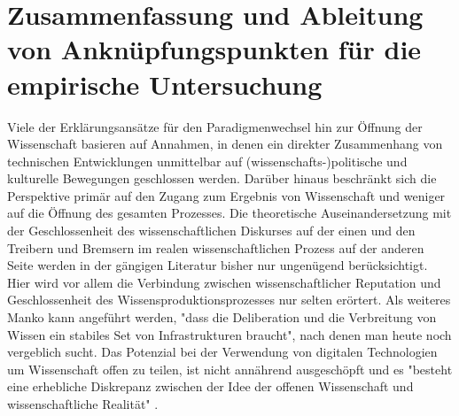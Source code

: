 \section{Zusammenfassung und Ableitung von Anknüpfungspunkten für die empirische Untersuchung}
Viele der Erklärungsansätze für den Paradigmenwechsel hin zur Öffnung der Wissenschaft basieren auf Annahmen, in denen ein direkter Zusammenhang von technischen Entwicklungen unmittelbar auf (wissenschafts-)politische und kulturelle Bewegungen geschlossen werden. Darüber hinaus beschränkt sich die Perspektive primär auf den Zugang zum Ergebnis von Wissenschaft und weniger auf die Öffnung des gesamten Prozesses. Die theoretische Auseinandersetzung mit der Geschlossenheit des wissenschaftlichen Diskurses auf der einen und den Treibern und Bremsern im realen wissenschaftlichen Prozess auf der anderen Seite werden in der gängigen Literatur bisher nur ungenügend berücksichtigt. Hier wird vor allem die Verbindung zwischen wissenschaftlicher Reputation und Geschlossenheit des Wissensproduktionsprozesses nur selten erörtert. Als weiteres Manko kann angeführt werden, "dass die Deliberation und die Verbreitung von Wissen ein stabiles Set von Infrastrukturen braucht"\cite{kelty_2004}, nach denen man heute noch vergeblich sucht. Das Potenzial bei der Verwendung von digitalen Technologien um Wissenschaft offen zu teilen, ist nicht annährend ausgeschöpft und es "besteht eine erhebliche Diskrepanz zwischen der Idee der offenen Wissenschaft und wissenschaftliche Realität" \cite{Scheliga_2014}.
